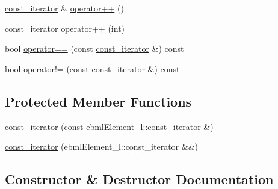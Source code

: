 \begin{DoxyCompactItemize}
\item 
\mbox{\hyperlink{classebml_1_1c__ebmlElement__l_1_1const__iterator}{const\+\_\+iterator}} \& \mbox{\hyperlink{classebml_1_1c__ebmlElement__l_1_1const__iterator_a12577f24536a29bfab7d13c5fa354668}{operator++}} ()
\item 
\mbox{\hyperlink{classebml_1_1c__ebmlElement__l_1_1const__iterator}{const\+\_\+iterator}} \mbox{\hyperlink{classebml_1_1c__ebmlElement__l_1_1const__iterator_ae22cfcee1250e01aea94976ea70fb59b}{operator++}} (int)
\item 
bool \mbox{\hyperlink{classebml_1_1c__ebmlElement__l_1_1const__iterator_ac347f9a256aeeabeb21ac2b6eca0b27f}{operator==}} (const \mbox{\hyperlink{classebml_1_1c__ebmlElement__l_1_1const__iterator}{const\+\_\+iterator}} \&) const
\item 
bool \mbox{\hyperlink{classebml_1_1c__ebmlElement__l_1_1const__iterator_a0939b817a498ef205a742832009ef45f}{operator!=}} (const \mbox{\hyperlink{classebml_1_1c__ebmlElement__l_1_1const__iterator}{const\+\_\+iterator}} \&) const
\end{DoxyCompactItemize}
\subsection*{Protected Member Functions}
\begin{DoxyCompactItemize}
\item 
\mbox{\hyperlink{classebml_1_1c__ebmlElement__l_1_1const__iterator_a38a5ec74d138c7add0e8d2660ae2575c}{const\+\_\+iterator}} (const ebml\+Element\+\_\+l\+::const\+\_\+iterator \&)
\item 
\mbox{\hyperlink{classebml_1_1c__ebmlElement__l_1_1const__iterator_a0c467c1dc6fb6daf73b42995b1237d82}{const\+\_\+iterator}} (ebml\+Element\+\_\+l\+::const\+\_\+iterator \&\&)
\end{DoxyCompactItemize}


\subsection{Constructor \& Destructor Documentation}
\mbox{\label{classebml_1_1c__ebmlElement__l_1_1const__iterator_a38a5ec74d138c7add0e8d2660ae2575c}} 
